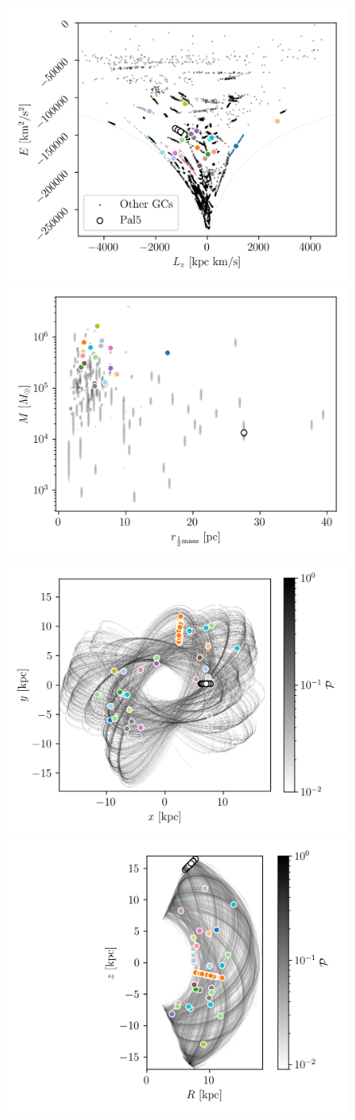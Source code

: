 \documentclass[draft]{aa}
\begin{document}
    \begin{figure}
      \centering
      \includegraphics[width=0.45\linewidth]{E_Lz_perturbers.png}
      \includegraphics[width=0.45\linewidth]{mass_size_plane.png}
      \includegraphics[width=0.45\linewidth]{impact_stats_phase_space_xy.png}
      \includegraphics[width=0.45\linewidth]{impact_stats_phase_space.png}

\end{figure}
\end{document}
